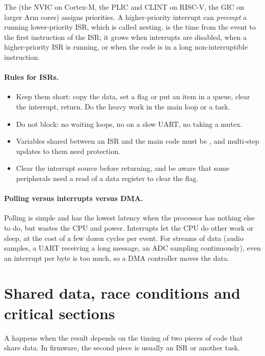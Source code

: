 The  (the NVIC on Cortex-M, the PLIC and CLINT on RISC-V, the GIC on larger Arm cores) assigns priorities. A higher-priority interrupt can \emph{preempt} a running lower-priority ISR, which is called nesting.  is the time from the event to the first instruction of the ISR; it grows when interrupts are disabled, when a higher-priority ISR is running, or when the code is in a long non-interruptible instruction.

\paragraph{Rules for ISRs.}
\begin{itemize}
  \item Keep them short: copy the data, set a flag or put an item in a queue, clear the interrupt, return. Do the heavy work in the main loop or a task.
  \item Do not block: no waiting loops, no  on a slow UART, no taking a mutex.
  \item Variables shared between an ISR and the main code must be , and multi-step updates to them need protection.
  \item Clear the interrupt source before returning, and be aware that some peripherals need a read of a data register to clear the flag.
\end{itemize}

\paragraph{Polling versus interrupts versus DMA.} Polling is simple and has the lowest latency when the processor has nothing else to do, but wastes the CPU and power. Interrupts let the CPU do other work or sleep, at the cost of a few dozen cycles per event. For streams of data (audio samples, a UART receiving a long message, an ADC sampling continuously), even an interrupt per byte is too much, so a DMA controller moves the data.

\section{Shared data, race conditions and critical sections}

A  happens when the result depends on the timing of two pieces of code that share data. In firmware, the second piece is usually an ISR or another task.

